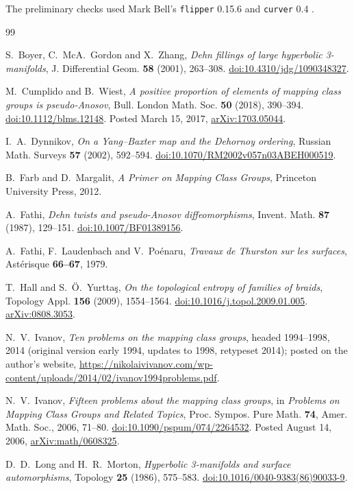 \documentclass[11pt]{article}
\theoremstyle{remark}
\newcommand{\doi}[1]{\href{https://doi.org/#1}{doi:#1}}
\begin{document}
The preliminary checks used Mark Bell's \texttt{flipper} 0.15.6
\cite{flipper} and \texttt{curver} 0.4 \cite{curver}. \begin{thebibliography}{99}

 S.~Boyer, C.~McA.~Gordon and X.~Zhang, \emph{Dehn fillings of
large hyperbolic 3-manifolds}, J. Differential Geom. \textbf{58} (2001),
263--308. \doi{10.4310/jdg/1090348327}.

 M.~Cumplido and B.~Wiest, \emph{A positive proportion of
elements of mapping class groups is pseudo-Anosov}, Bull. London Math. Soc.
\textbf{50} (2018), 390--394. \doi{10.1112/blms.12148}. Posted March 15,
2017, \href{https://arxiv.org/abs/1703.05044}{arXiv:1703.05044}.

 I.~A.~Dynnikov, \emph{On a Yang--Baxter map and the
Dehornoy ordering}, Russian Math. Surveys \textbf{57} (2002), 592--594.
\doi{10.1070/RM2002v057n03ABEH000519}.

 B.~Farb and D.~Margalit, \emph{A Primer on Mapping Class
Groups}, Princeton University Press, 2012.

 A.~Fathi, \emph{Dehn twists and pseudo-Anosov
diffeomorphisms}, Invent. Math. \textbf{87} (1987), 129--151.
\doi{10.1007/BF01389156}.

 A.~Fathi, F.~Laudenbach and V.~Poénaru, \emph{Travaux de
Thurston sur les surfaces}, Astérisque \textbf{66--67}, 1979.

 T.~Hall and S.~Ö.~Yurttaş, \emph{On the topological entropy of
families of braids}, Topology Appl. \textbf{156} (2009), 1554--1564.
\doi{10.1016/j.topol.2009.01.005}. \href{https://arxiv.org/abs/0808.3053}{arXiv:0808.3053}.

 N.~V.~Ivanov, \emph{Ten problems on the mapping class
groups}, headed 1994--1998, 2014 (original version early 1994,
updates to 1998, retypeset 2014); posted on the author's website,
\url{https://nikolaivivanov.com/wp-content/uploads/2014/02/ivanov1994problems.pdf}.

 N.~V.~Ivanov, \emph{Fifteen problems about the mapping
class groups}, in \emph{Problems on Mapping Class Groups and Related
Topics}, Proc. Sympos. Pure Math. \textbf{74}, Amer. Math. Soc., 2006,
71--80. \doi{10.1090/pspum/074/2264532}. Posted August 14, 2006,
\href{https://arxiv.org/abs/math/0608325}{arXiv:math/0608325}.

 D.~D.~Long and H.~R.~Morton, \emph{Hyperbolic 3-manifolds and
surface automorphisms}, Topology \textbf{25} (1986), 575--583.
\doi{10.1016/0040-9383(86)90033-9}.


\end{thebibliography}
\end{document}
